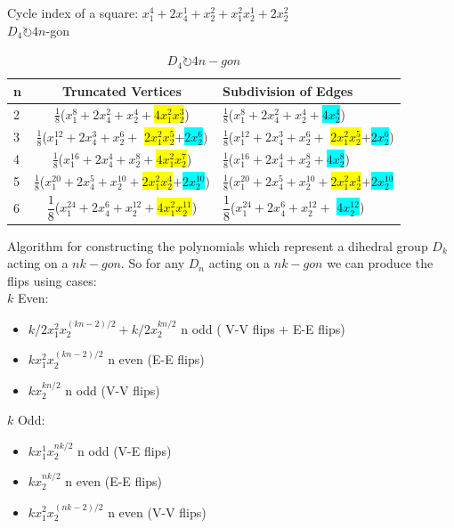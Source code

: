\documentclass{beamer}
\begin{document}
\begin{frame}
Cycle index of a square:
$x_1^4+2x_4^1+x_2^2+x_1^2x_2^1+2x_2^2$\\

$D_4 \circlearrowright 4n$-gon\\

\begin{table}
\centering
\begin{tabular}{l|c|l}
n & Truncated Vertices & Subdivision of Edges\\ \hline
2 &
$\frac{1}{8}$($x_1^8+2x_4^2+x_2^4+$\colorbox{yellow}{$4x_1^2x_2^3$}) &
$\frac{1}{8}$($x_1^8+2x_4^2+x_2^4+$\colorbox{cyan}{$4x_2^4$})\\
3 &
$\frac{1}{8}$($x_1^{12} +2x_4^3+x_2^6+$ \colorbox{yellow}{$2x_1^2x_2^5$}$+$\colorbox{cyan}{$2x_2^6$}) &
$\frac{1}{8}$($x_1^{12} +2x_4^3+x_2^6+$ \colorbox{yellow}{$2x_1^2x_2^5$}$+$\colorbox{cyan}{$2x_2^6$})\\
4 &
$\frac{1}{8}$($x_1^{16}+2x_4^4+x_2^8+$\colorbox{yellow}{$4x_1^2x_2^7$}) &
$\frac{1}{8}$($x_1^{16}+2x_4^4+x_2^8+$\colorbox{cyan}{$4x_2^8$})\\
5 &
$\frac{1}{8}$($x_1^{20}+2x_4^5+x_2^{10}+$\colorbox{yellow}{$2x_1^2x_2^4$}$+$\colorbox{cyan}{$2x_2^{10}$}) &
$\frac{1}{8}$($x_1^{20}+2x_4^5+x_2^{10}+$\colorbox{yellow}{$2x_1^2x_2^4$}$+$\colorbox{cyan}{$2x_2^{10}$}\\
6 & $\dfrac{1}{8}$($x_1^{24}+2x_4^6+x_2^{12}+$\colorbox{yellow}{$4x_1^2x_2^{11}$}) & $\dfrac{1}{8}$($ x_1^24+2x_4^6+x_2^{12}+$ \colorbox{cyan}{$4x_2^{12}$})\\

\end{tabular}
\caption{$D_4 \circlearrowright 4n-gon$}
\end{table}
\end{frame}
\begin{frame}{Algorithm for constructing the polynomials  which represent a dihedral group $D_k$ acting on a $nk-gon$.}
So for any $D_n$ acting on a $nk-gon$ we can produce the flips using cases:\\
	 $k$ Even:\\
			\begin{itemize}
    			\item $k/2x_1^2x_2^{(kn-2)/2}+k/2x_2^{kn/2}$ n odd ( V-V flips + E-E flips)
                \item $kx_1^2x_2^{(kn-2)/2}$ n even (E-E flips)
                \item $kx_2^{kn/2}$ n odd (V-V flips)
             \end{itemize}
         $k$ Odd:\\
         	\begin{itemize}
            	\item $kx_1^1x_2^{nk/2}$ n odd (V-E flips)
                \item $kx_2^{nk/2}$ n even (E-E flips)
                \item $kx_1^2x_2^{(nk-2)/2}$ n even (V-V flips)
            \end{itemize}

\end{frame}
\end{document}
